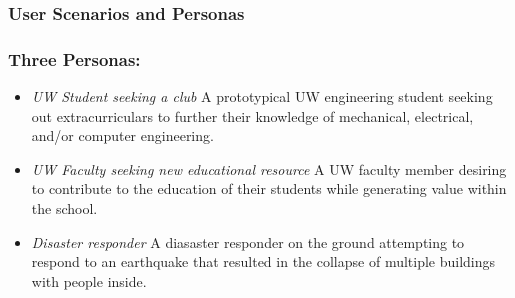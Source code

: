 \documentclass[a4paper, 10pt]{article}
\begin{document}
			
		\subsubsection{User Scenarios and Personas}
		\subsubsection*{Three Personas:}
		\begin{itemize}
			\item
			
			\emph{UW Student seeking a club} A prototypical UW engineering student seeking out extracurriculars to further their knowledge of mechanical, electrical, and/or computer  engineering. 
			
			\item
			\emph{UW Faculty seeking new educational resource} A UW faculty member desiring to contribute to the education of their students while generating value within the school.
			
			\item
			\emph{Disaster responder} A diasaster responder on the ground attempting to respond to an earthquake that resulted in the collapse of multiple buildings with people inside.
		\end{itemize}
		
		
\end{document}
